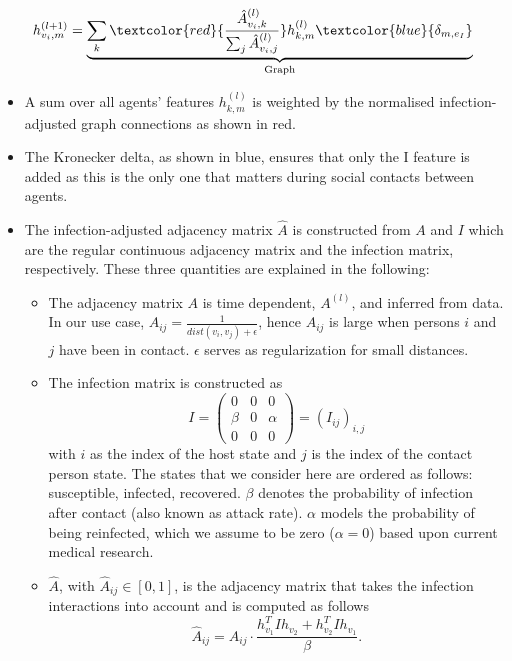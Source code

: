\documentclass[%
 reprint,
 amsmath,amssymb,showkeys,
 aps,
]{revtex4-1}
\begin{document}
\begin{equation}
h_{v_i, m}^{(l+1)}
=
\underbrace{
	\sum_k \textcolor{red}{\frac{\hat{A}_{v_i, k}^{(l)}}{\sum_j \hat{A}_{v_i, j}^{(l)}}} h_{k, m}^{(l)} \textcolor{blue}{\delta_{m, e_I}}
}_{\text{Graph}}
\end{equation}

\begin{itemize}
	\item A sum over all agents' features $h_{k,m}^{(l)}$ is weighted by the normalised infection-adjusted graph connections as shown in red.
	\item The Kronecker delta, as shown in blue, ensures that only the I feature is added as this is the only one that matters during social contacts between agents.
	\item The infection-adjusted adjacency matrix $\hat{A}$ is constructed from $A$ and $I$ which are the regular continuous adjacency matrix and the infection matrix, respectively. These three quantities are explained in the following:
	\begin{itemize}
		\item The adjacency matrix $A$ is time dependent, $A^{(l)}$, and inferred from data. In our use case, $A_{ij} = \frac{1}{dist(v_i, v_j)+\epsilon}$, hence $A_{ij}$ is large when persons $i$ and $j$ have been in contact. $\epsilon$ serves as regularization for small distances.
		\item The infection matrix is constructed as
		\begin{equation}
		I =
		\begin{pmatrix}
		0     &  0  & 0 \\
		\beta &  0  & \alpha \\
		0     &  0  & 0
		\end{pmatrix}
		=
		(I_{ij})_{i,j}
		\end{equation}
		with $i$ as the index of the host state and $j$ is the index of the contact person state. The states that we consider here are ordered as follows: susceptible, infected, recovered. $\beta$ denotes the probability of infection  after contact (also known as attack rate). $\alpha$ models the probability of being reinfected, which we assume to be zero ($\alpha=0$) based upon current medical research.
		\item $\hat{A}$, with $\hat{A}_{ij}\in [0, 1]$, is the adjacency matrix that takes the infection interactions into account and is computed as follows
		\begin{equation}
		\hat{A}_{ij} = A_{ij}\cdot \frac{ h_{v_1}^T I h_{v_2} + h_{v_2}^T I h_{v_1} }{\beta}.

\end{equation}
\end{itemize}
\end{itemize}
\end{document}
